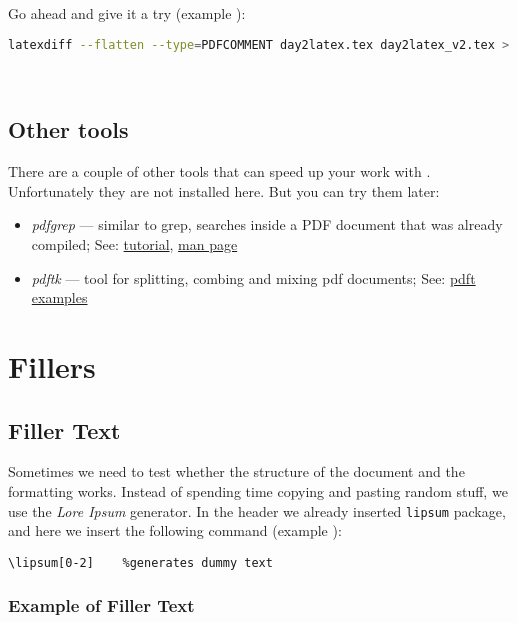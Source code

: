 \documentclass[a4paper,10pt]{report} %
\newcounter{samplecode}[chapter]
\begin{document}
Go ahead and give it a try  (example ):

\begin{lstlisting}[language={bash}, frame=single,basicstyle=\footnotesize]
  latexdiff --flatten --type=PDFCOMMENT day2latex.tex day2latex_v2.tex > differentcom.tex
\end{lstlisting}~\vspace{0ex}

\subsection{Other tools}

There are a couple of other tools that can speed up your work with .
Unfortunately they are not installed here. But you can try them later:
\begin{itemize}
    \item \emph{pdfgrep} --- similar to grep, searches inside a PDF document that was already compiled; See: \href{https://www.geeksforgeeks.org/pdfgrep-command-in-linux/}{tutorial},  \href{https://pdfgrep.org/doc.html}{man page}
    \item \emph{pdftk} --- tool for splitting, combing and mixing pdf documents; See: \href{https://www.pdflabs.com/docs/pdftk-cli-examples/}{pdft examples}
\end{itemize}


\section{Fillers}
 \subsection{Filler Text}
 Sometimes we need to test whether the structure of the document and the formatting works. Instead of spending time copying and pasting random stuff, we use the  \emph{Lore Ipsum} generator.
In the header we already inserted \texttt{lipsum} package, and here we insert the following command (example ):
\begin{lstlisting}[language={[latex]tex}, frame=single,basicstyle=\footnotesize]
  \lipsum[0-2]    %generates dummy text
\end{lstlisting}
 \subsubsection{Example of Filler Text}
\lipsum[0-2]    %
\end{document}
